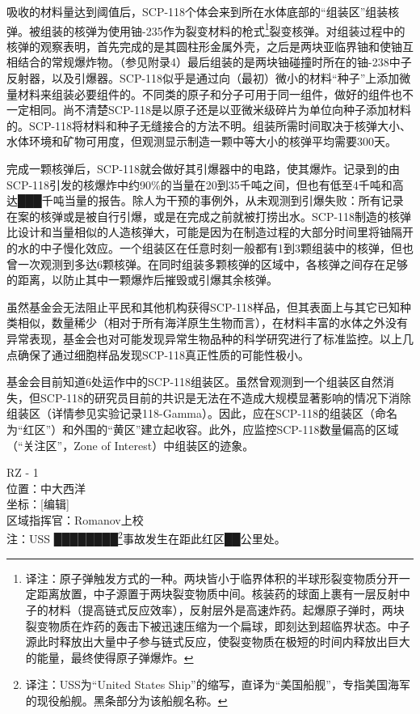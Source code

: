 吸收的材料量达到阈值后，SCP-118个体会来到所在水体底部的“组装区”组装核弹。被组装的核弹为使用铀-235作为裂变材料的枪式\footnote{译注：原子弹触发方式的一种。两块皆小于临界体积的半球形裂变物质分开一定距离放置，中子源置于两块裂变物质中间。核装药的球面上裹有一层反射中子的材料（提高链式反应效率），反射层外是高速炸药。起爆原子弹时，两块裂变物质在炸药的轰击下被迅速压缩为一个扁球，即刻达到超临界状态。中子源此时释放出大量中子参与链式反应，使裂变物质在极短的时间内释放出巨大的能量，最终使得原子弹爆炸。}裂变核弹。对组装过程中的核弹的观察表明，首先完成的是其圆柱形金属外壳，之后是两块亚临界铀和使铀互相结合的常规爆炸物。（参见附录4）最后组装的是两块铀碰撞时所在的铀-238中子反射器，以及引爆器。SCP-118似乎是通过向（最初）微小的材料“种子”上添加微量材料来组装必要组件的。不同类的原子和分子可用于同一组件，做好的组件也不一定相同。尚不清楚SCP-118是以原子还是以亚微米级碎片为单位向种子添加材料的。SCP-118将材料和种子无缝接合的方法不明。组装所需时间取决于核弹大小、水体环境和矿物可用度，但观测显示制造一颗中等大小的核弹平均需要300天。

完成一颗核弹后，SCP-118就会做好其引爆器中的电路，使其爆炸。记录到的由SCP-118引发的核爆炸中约90\%的当量在20到35千吨之间，但也有低至4千吨和高达███千吨当量的报告。除人为干预的事例外，从未观测到引爆失败：所有记录在案的核弹或是被自行引爆，或是在完成之前就被打捞出水。SCP-118制造的核弹比设计和当量相似的人造核弹大，可能是因为在制造过程的大部分时间里将铀隔开的水的中子慢化效应。一个组装区在任意时刻一般都有1到3颗组装中的核弹，但也曾一次观测到多达6颗核弹。在同时组装多颗核弹的区域中，各核弹之间存在足够的距离，以防止其中一颗爆炸后摧毁或引爆其余核弹。

虽然基金会无法阻止平民和其他机构获得SCP-118样品，但其表面上与其它已知种类相似，数量稀少（相对于所有海洋原生生物而言），在材料丰富的水体之外没有异常表现，基金会也对可能发现异常生物品种的科学研究进行了标准监控。以上几点确保了通过细胞样品发现SCP-118真正性质的可能性极小。

基金会目前知道6处运作中的SCP-118组装区。虽然曾观测到一个组装区自然消失，但SCP-118的研究员目前的共识是无法在不造成大规模显著影响的情况下消除组装区（详情参见实验记录118-Gamma）。因此，应在SCP-118的组装区（命名为“红区”）和外围的“黄区”建立起收容。此外，应监控SCP-118数量偏高的区域（“关注区”，Zone of Interest）中组装区的迹象。




RZ - 1\\
位置：中大西洋\\
坐标：{[}编辑]\\
区域指挥官：Romanov上校\\
注：USS ████████\footnote{译注：USS为“United States Ship”的缩写，直译为“美国船舰”，专指美国海军的现役船舰。黑条部分为该船舰名称。}事故发生在距此红区██公里处。

